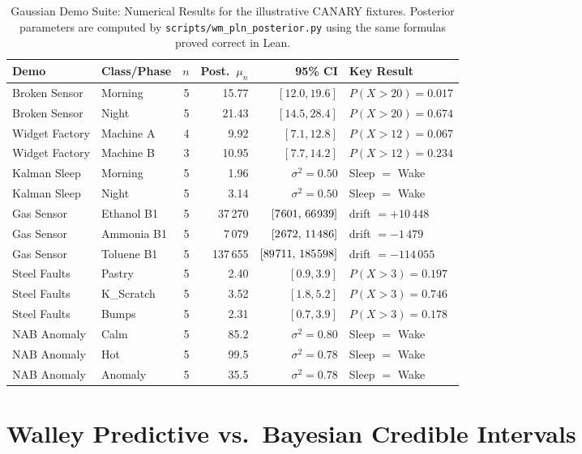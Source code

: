 \documentclass[11pt,openany]{report}
\begin{document}
\begin{table}[htbp]
\centering
\caption{Gaussian Demo Suite: Numerical Results for the illustrative
  CANARY fixtures.  Posterior parameters are computed by
  \texttt{scripts/wm\_pln\_posterior.py} using the same formulas proved
  correct in Lean.}
\label{tab:gaussian-demo-results}
\small
\begin{tabular}{llrrrl}
\toprule
Demo & Class/Phase & $n$ & Post.\ $\mu_n$ & 95\% CI & Key Result \\
\midrule
Broken Sensor & Morning & 5 & 15.77 & $[12.0, 19.6]$ & $P(X{>}20) = 0.017$ \\
Broken Sensor & Night & 5 & 21.43 & $[14.5, 28.4]$ & $P(X{>}20) = 0.674$ \\
\addlinespace
Widget Factory & Machine A & 4 & 9.92 & $[7.1, 12.8]$ & $P(X{>}12) = 0.067$ \\
Widget Factory & Machine B & 3 & 10.95 & $[7.7, 14.2]$ & $P(X{>}12) = 0.234$ \\
\addlinespace
Kalman Sleep & Morning & 5 & 1.96 & $\sigma^2{=}0.50$ & Sleep $=$ Wake \\
Kalman Sleep & Night & 5 & 3.14 & $\sigma^2{=}0.50$ & Sleep $=$ Wake \\
\addlinespace
Gas Sensor & Ethanol B1 & 5 & 37\,270 & $[7\mkern1mu601,\, 66\mkern1mu939]$ & drift $= +10\,448$ \\
Gas Sensor & Ammonia B1 & 5 & 7\,079 & $[2\mkern1mu672,\, 11\mkern1mu486]$ & drift $= -1\,479$ \\
Gas Sensor & Toluene B1 & 5 & 137\,655 & $[89\mkern1mu711,\, 185\mkern1mu598]$ & drift $= -114\,055$ \\
\addlinespace
Steel Faults & Pastry & 5 & 2.40 & $[0.9, 3.9]$ & $P(X{>}3) = 0.197$ \\
Steel Faults & K\_Scratch & 5 & 3.52 & $[1.8, 5.2]$ & $P(X{>}3) = \mathbf{0.746}$ \\
Steel Faults & Bumps & 5 & 2.31 & $[0.7, 3.9]$ & $P(X{>}3) = 0.178$ \\
\addlinespace
NAB Anomaly & Calm & 5 & 85.2 & $\sigma^2{=}0.80$ & Sleep $=$ Wake \\
NAB Anomaly & Hot & 5 & 99.5 & $\sigma^2{=}0.78$ & Sleep $=$ Wake \\
NAB Anomaly & Anomaly & 5 & 35.5 & $\sigma^2{=}0.78$ & Sleep $=$ Wake \\
\bottomrule
\end{tabular}
\end{table}

\section{Walley Predictive vs.\ Bayesian Credible Intervals}
\end{document}
